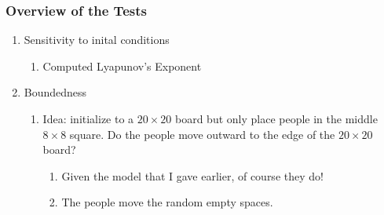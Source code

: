 \documentclass[11pt, handout]{beamer}
\begin{document}
\begin{frame}
    \frametitle{Overview of the Tests}
    \begin{enumerate}
        \item Sensitivity to inital conditions
            \begin{enumerate}
                \item Computed Lyapunov's Exponent
            \end{enumerate}
        \item Boundedness
            \begin{enumerate}
                \item Idea: initialize to a $20 \times 20$ board but only place people in the middle $8\times 8$ square. Do the people move outward to the edge of the $20 \times 20$ board?
                    \begin{enumerate}
                        \item Given the model that I gave earlier, of course they do!
                        \item The people move the random empty spaces.
                    \end{enumerate}


\end{enumerate}
\end{enumerate}
\end{frame}
\end{document}
